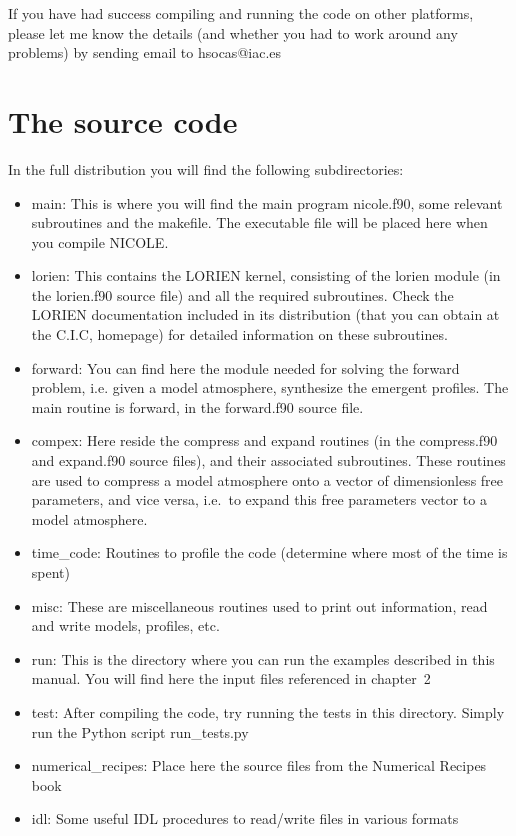 If you have had success compiling and running the code on other
platforms, please let me know the details (and whether you had to work
around any problems) by sending email to hsocas@iac.es

\chapter{The source code}

In the full distribution you will find the following subdirectories: 
\begin{itemize}
\item main: This is where you will find the main program nicole.f90, 
      some relevant subroutines and the makefile. The executable 
      file will be placed here when you compile NICOLE.
\item lorien: This contains the LORIEN kernel, consisting of the 
      lorien module (in the lorien.f90 source file) and all the 
      required subroutines. Check the LORIEN documentation
      included in its distribution (that you can obtain at the 
      C.I.C, homepage) for detailed information on these subroutines.
\item forward: You can find here the module needed for solving 
      the forward problem, i.e. given a model atmosphere, 
      synthesize the emergent profiles. The main routine is forward, 
      in the forward.f90 source file. 
\item compex: Here reside the compress and expand routines 
      (in the compress.f90 and expand.f90 source files), and their 
      associated subroutines. These routines are used to
      compress a model atmosphere onto a vector of dimensionless free 
      parameters, and vice versa, i.e.\ to expand this free parameters 
      vector to a model atmosphere.
\item time\_code: Routines to profile the code (determine where most
      of the time is spent)
\item misc: These are miscellaneous routines used to print out information, 
      read and write models, profiles, etc.
\item run: This is the directory where you can run the examples described 
      in this manual.
      You will find here the input files referenced in chapter~2
\item test: After compiling the code, try running the tests in this
  directory. Simply run the Python script run\_tests.py
\item numerical\_recipes: Place here the source files from the Numerical Recipes book
\item idl: Some useful IDL procedures to read/write files in various formats
\end{itemize}

